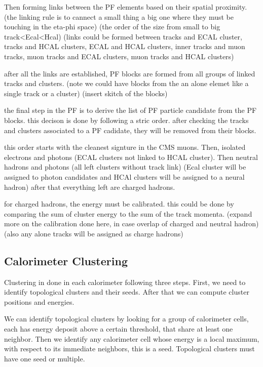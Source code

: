 Then forming links between the PF elements based on their spatial proximity.
(the linking rule is to cannect a small thing a big one where they must be touching in the eta-phi space)
(the order of the size from small to big track<Ecal<Hcal)
(links could be formed between tracks and ECAL cluster, tracks and HCAL clusters, ECAL and HCAL clusters, inner tracks and muon tracks, muon tracks and ECAL clusters, muon tracks and HCAL clusters)

after all the links are established, PF blocks are formed from all groups of linked tracks and clusters.  
(note we could have blocks from the an alone elemet like a single track or a cluster) 
(insert skitch of the blocks) 

the final step in the PF is to derive the list of PF particle candidate from the PF blocks.
this decison is done by following a stric order. after checking the tracks and clusters associated to a PF cadidate, they will be removed from their blocks.

this order starts with the cleanest signture in the CMS muons. Then, isolated electrons and photons (ECAL clusters not linked to HCAL cluster).
Then neutral hadrons and photons (all left clusters without track link) (Ecal cluster will be assigned to photon candidates and HCAl clusters will be assigned to a neural hadron)
after that everything left are charged hadrons.

for charged hadrons, the energy must be calibrated. this could be done by comparing the sum of cluster energy to the sum of the track momenta.
(expand more on the calibration done here, in case overlap of charged and neutral hadron)
(also any alone tracks will be assigned as charge hadrons)

\subsection{Calorimeter Clustering}

Clustering in done in each calorimeter following three steps.
First, we need to identify topological clusters and their seeds. After that we can compute cluster positions and energies.

We can identify topological clusters by looking for a group of calorimeter cells, each has energy deposit above a certain threshold, that share at least one neighbor.
Then we identify any calorimeter cell whose energy is a local maximum, with respect to its immediate neighbors, this is a seed.
Topological clusters must have one seed or multiple.


